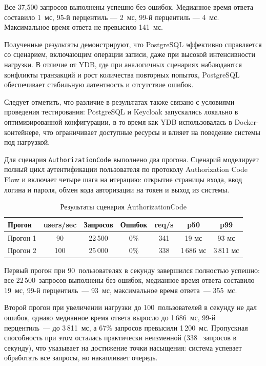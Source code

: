 \documentclass[times]{itmo-student-thesis}
\begin{document}
Все 37,500 запросов выполнены успешно без ошибок.
Медианное время ответа составило 1~мс, 95-й перцентиль — 2~мс, 99-й перцентиль — 4~мс.
Максимальное время ответа не превысило 141~мс.

Полученные результаты демонстрируют, что PostgreSQL эффективно справляется со сценарием,
включающим операции записи, даже при высокой интенсивности нагрузки.
В отличие от YDB, где при аналогичных сценариях наблюдаются конфликты транзакций
и рост количества повторных попыток, PostgreSQL обеспечивает стабильную
латентность и отсутствие ошибок.

Следует отметить, что различие в результатах также связано с условиями проведения тестирования:
PostgreSQL и Keycloak запускались локально в оптимизированной конфигурации,
в то время как YDB использовалась в Docker-контейнере, что ограничивает доступные ресурсы
и влияет на поведение системы под нагрузкой.

Для сценария \texttt{AuthorizationCode} выполнено два прогона.
Сценарий моделирует полный цикл аутентификации пользователя по протоколу
Authorization Code Flow и включает четыре шага на итерацию:
открытие страницы входа, ввод логина и пароля, обмен кода авторизации
на токен и выход из системы.

\begin{table}[H]
\centering
\begin{tabular}{|l|c|c|c|c|c|c|}
\hline
\textbf{Прогон} & \textbf{users/sec} & \textbf{Запросов} & \textbf{Ошибок} & \textbf{req/s} & \textbf{p50} & \textbf{p99} \\
\hline
Прогон 1  & 90  & 22\,500 & 0\%  & 341  & 19 мс       & 93 мс \\
Прогон 2  & 100 & 25\,000 & 0\%  & 338  & 1\,686 мс   & 3\,811 мс \\
\hline
\end{tabular}
\caption{Результаты сценария AuthorizationCode}
\label{tab:load-auth-code}
\end{table}

Первый прогон при 90~пользователях в секунду завершился полностью успешно:
все 22\,500~запросов выполнены без ошибок, медианное время ответа составило
19~мс, 99-й перцентиль~--- 93~мс, максимальное время ответа~--- 355~мс.

Второй прогон при увеличении нагрузки до 100~пользователей в секунду
не дал ошибок, однако медианное время ответа выросло до 1\,686~мс,
99-й перцентиль~--- до 3\,811~мс, а 67\% запросов превысили 1\,200~мс.
Пропускная способность при этом осталась практически неизменной (338~ запросов в секунду),
что указывает на достижение точки насыщения: система успевает
обработать все запросы, но накапливает очередь.
\end{document}
